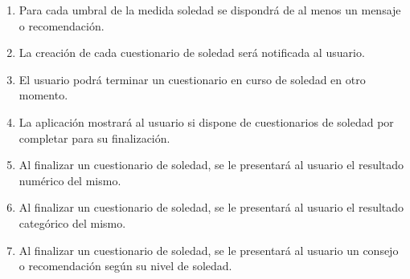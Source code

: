 \begin{enumerate}[resume=req-usuario,label=\textbf{\texttt{RU-\arabic*}}]
\begin{enumerate}[resume=req-funcionales,label=\textbf{\texttt{RF-\arabic*}}]
                \item \label{req:funcionales:soledad_umbrales_consejo} Para cada umbral de la medida soledad se dispondrá de al menos un mensaje o recomendación.
                \item \label{req:funcionales:soledad_notificacion} La creación de cada cuestionario de soledad será notificada al usuario.
                \item \label{req:funcionales:soledad_cuestionario_aplazar} El usuario podrá terminar un cuestionario en curso de soledad en otro momento.
                \item \label{req:funcionales:soledad_cuestionario_pendientes} La aplicación mostrará al usuario si dispone de cuestionarios de soledad por completar para su finalización.
                \item \label{req:funcionales:soledad_cuestionario_numero} Al finalizar un cuestionario de soledad, se le presentará al usuario el resultado numérico del mismo.
                \item \label{req:funcionales:soledad_cuestionario_categoria} Al finalizar un cuestionario de soledad, se le presentará al usuario el resultado categórico del mismo.
                \item \label{req:funcionales:soledad_cuestionario_consejo} Al finalizar un cuestionario de soledad, se le presentará al usuario un consejo o recomendación según su nivel de soledad.
            \end{enumerate}
        \end{enumerate}
